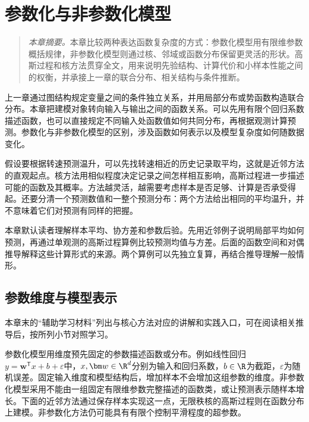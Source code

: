 \chapter{参数化与非参数化模型}
\begin{quote}\small
\textit{本章摘要。}本章比较两种表达函数复杂度的方式：参数化模型用有限维参数概括规律，非参数化模型则通过核、邻域或函数分布保留更灵活的形状。高斯过程和核方法贯穿全文，用来说明先验结构、计算代价和小样本性能之间的权衡，并承接上一章的联合分布、相关结构与条件推断。
\end{quote}
上一章通过图结构规定变量之间的条件独立关系，并用局部分布或势函数构造联合分布。本章把建模对象转向输入与输出之间的函数关系。可以先用有限个回归系数描述函数，也可以直接规定不同输入处函数值如何共同分布，再根据观测计算预测。参数化与非参数化模型的区别，涉及函数如何表示以及模型复杂度如何随数据变化。

假设要根据转速预测温升，可以先找转速相近的历史记录取平均，这就是近邻方法的直观起点。核方法用相似程度决定记录之间怎样相互影响，高斯过程进一步描述可能的函数及其概率。方法越灵活，越需要考虑样本是否足够、计算是否承受得起。还要分清一个预测数值和一整个预测分布：两个方法给出相同的平均温升，并不意味着它们对预测有同样的把握。

本章默认读者理解样本平均、协方差和参数后验。先用近邻例子说明局部平均如何预测，再通过单观测的高斯过程算例比较预测均值与方差。后面的函数空间和对偶推导解释这些计算形式的来源。两个算例可以先独立复算，再结合推导理解一般情形。

\section{参数维度与模型表示}

本章末的“辅助学习材料”列出与核心方法对应的讲解和实践入口，可在阅读相关推导后，按所列小节对照学习。

参数化模型用维度预先固定的参数描述函数或分布。例如线性回归$y=\bm{w}^{\mathsf T}x+b+\varepsilon$中，$x,\bm w\in\R^d$分别为输入和回归系数，$b\in\R$为截距，$\varepsilon$为随机误差。固定输入维度和模型结构后，增加样本不会增加这组参数的维度。非参数化模型采用不能由一组固定有限维参数完整描述的函数类，或让预测表示随样本增长。下面的近邻方法通过保存样本实现这一点，无限秩核的高斯过程则在函数分布上建模。非参数化方法仍可能具有有限个控制平滑程度的超参数。

